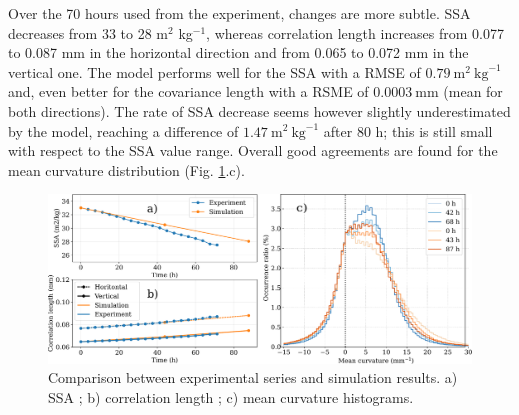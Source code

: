\documentclass[draft,ms]{agujournal2019}
\begin{document}
 Over the 70 hours used from the  experiment, changes are more subtle. SSA decreases from 33 to 28 m$^2$ kg$^{-1}$, whereas correlation length increases from 0.077 to 0.087 mm in the horizontal direction and from 0.065 to 0.072 mm in the vertical one. The model performs well for the SSA with a RMSE of $0.79\ \mathrm{m}^2\ \mathrm{kg}^{-1}$ and, even better for the covariance length with a RSME of $0.0003\ \mathrm{mm}$ (mean for both directions).
The rate of SSA decrease seems however slightly underestimated by the model, reaching a difference of $1.47\ \mathrm{m}^2\ \mathrm{kg}^{-1}$ after 80 h; this is still small with respect to the SSA value range.
Overall good agreements are found for the mean curvature distribution (Fig. \ref{fig:eboni}.c). \\








\begin{figure}
    \centering
    \includegraphics[width=\linewidth]{Figures/eboni_courbes_lc_ssa_histo.pdf}
    \caption{Comparison between \protect{} experimental series and simulation results. a) SSA ; b) correlation length ; c) mean curvature histograms.}
    \label{fig:eboni}
\end{figure}
\end{document}
